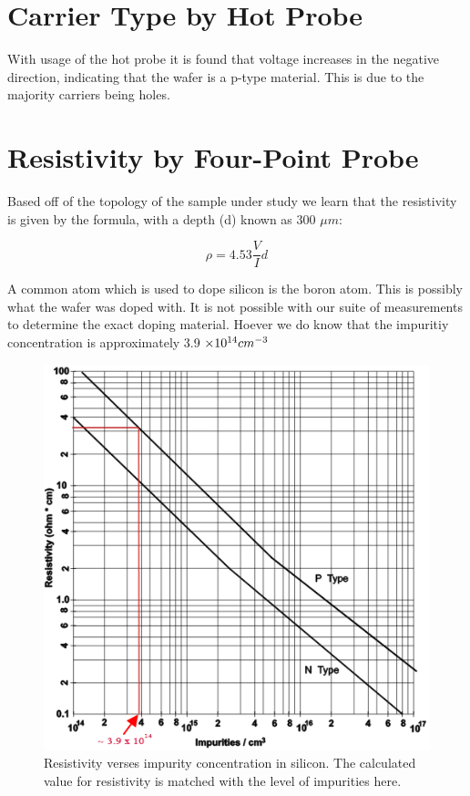\section{Carrier Type by Hot Probe}

With usage of the hot probe it is found that voltage increases in the negative direction, indicating that the wafer is a p-type material. This is due to the majority carriers being holes.

\section{Resistivity by Four-Point Probe}

Based off of the topology of the sample under study we learn that the resistivity is given by the formula, with a depth (d) known as 300 $\mu m$:

\begin{equation}
    \rho = 4.53 \frac{V}{I} d
    \label{eqn:resist}
\end{equation}

A common atom which is used to dope silicon is the boron atom. This is possibly what the wafer was doped with. It is not possible with our suite of measurements to determine the exact doping material. Hoever we do know that the impuritiy concentration is approximately 3.9 $\times10^{14}cm^{-3}$ 

\begin{table}[H]
    \centering
    
    \caption{Values taken from 4 point measurement. Resistivity calculated using equation \ref{eqn:resist}, and impurity calculated using Figure \ref{fig:impurities}}
    \label{tab:4point}
\end{table}

\begin{figure}[H]
    \centering
    \includegraphics[width=.475\textwidth]{figures/Impurities.png}
    \caption{Resistivity verses impurity concentration in silicon. The calculated value for resistivity is matched with the level of impurities here.}
    \label{fig:impurities}
\end{figure}

